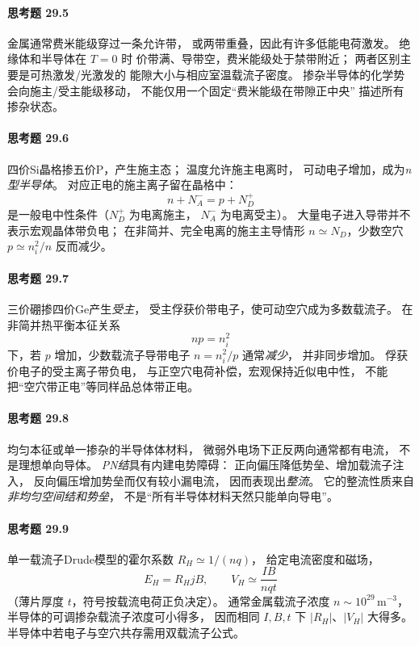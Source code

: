 \paragraph{思考题 29.5}
金属通常费米能级穿过一条允许带，
或两带重叠，因此有许多低能电荷激发。
绝缘体和半导体在 \(T=0\) 时
价带满、导带空，费米能级处于禁带附近；
两者区别主要是可热激发/光激发的
能隙大小与相应室温载流子密度。
掺杂半导体的化学势会向施主/受主能级移动，
不能仅用一个固定“费米能级在带隙正中央”
描述所有掺杂状态。

\paragraph{思考题 29.6}
四价Si晶格掺五价P，产生施主态；
温度允许施主电离时，
可动电子增加，成为\emph{n型半导体}。
对应正电的施主离子留在晶格中：
\[
\boxed{n+N_A^-=p+N_D^+}
\]
是一般电中性条件（\(N_D^+\) 为电离施主，
\(N_A^-\) 为电离受主）。
大量电子进入导带并不表示宏观晶体带负电；
在非简并、完全电离的施主主导情形
\(n\simeq N_D\)，少数空穴
\(p\simeq n_i^2/n\) 反而减少。

\paragraph{思考题 29.7}
三价硼掺四价Ge产生\emph{受主}，
受主俘获价带电子，使可动空穴成为多数载流子。
在非简并热平衡本征关系
\[
\boxed{np=n_i^2}
\]
下，若 \(p\) 增加，少数载流子导带电子
\(n=n_i^2/p\) 通常\emph{减少}，
并非同步增加。
俘获价电子的受主离子带负电，
与正空穴电荷补偿，宏观保持近似电中性，
不能把“空穴带正电”等同样品总体带正电。

\paragraph{思考题 29.8}
均匀本征或单一掺杂的半导体体材料，
微弱外电场下正反两向通常都有电流，
不是理想单向导体。
\emph{PN结}具有内建电势障碍：
正向偏压降低势垒、增加载流子注入，
反向偏压增加势垒而仅有较小漏电流，
因而表现出\emph{整流}。
它的整流性质来自\emph{非均匀空间结和势垒}，
不是“所有半导体材料天然只能单向导电”。

\paragraph{思考题 29.9}
单一载流子Drude模型的霍尔系数
\(R_H\simeq1/(nq)\)，
给定电流密度和磁场，
\[
\boxed{E_H=R_H jB},\qquad
V_H\simeq\frac{IB}{nqt}
\]
（薄片厚度 \(t\)，符号按载流电荷正负决定）。
通常金属载流子浓度 \(n\sim10^{29}\,\mathrm{m^{-3}}\)，
半导体的可调掺杂载流子浓度可小得多，
因而相同 \(I,B,t\) 下
\(|R_H|\)、\(|V_H|\) 大得多。
半导体中若电子与空穴共存需用双载流子公式。

